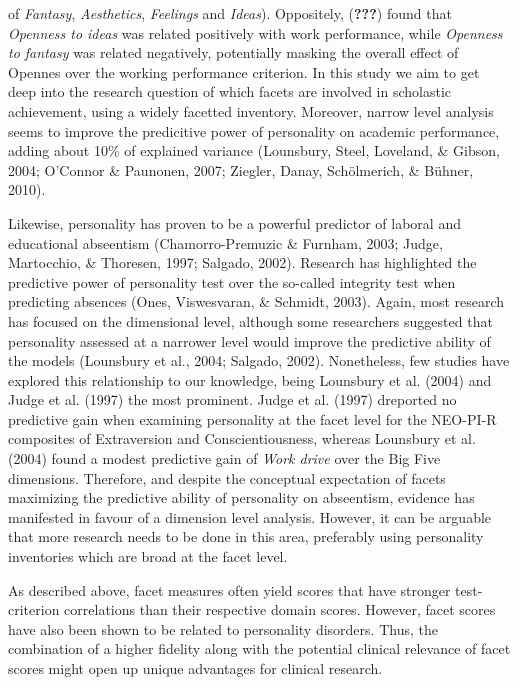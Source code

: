 \documentclass[,man,floatsintext]{apa6}
\begin{document}
of \emph{Fantasy}, \emph{Aesthetics}, \emph{Feelings} and \emph{Ideas}).
Oppositely, ({\textbf{???}}) found that \emph{Openness to ideas} was
related positively with work performance, while \emph{Openness to
fantasy} was related negatively, potentially masking the overall effect
of Opennes over the working performance criterion. In this study we aim
to get deep into the research question of which facets are involved in
scholastic achievement, using a widely facetted inventory. Moreover,
narrow level analysis seems to improve the predicitive power of
personality on academic performance, adding about 10\% of explained
variance (Lounsbury, Steel, Loveland, \& Gibson, 2004; O'Connor \&
Paunonen, 2007; Ziegler, Danay, Schölmerich, \& Bühner, 2010).

Likewise, personality has proven to be a powerful predictor of laboral
and educational abseentism (Chamorro-Premuzic \& Furnham, 2003; Judge,
Martocchio, \& Thoresen, 1997; Salgado, 2002). Research has highlighted
the predictive power of personality test over the so-called integrity
test when predicting absences (Ones, Viswesvaran, \& Schmidt, 2003).
Again, most research has focused on the dimensional level, although some
researchers suggested that personality assessed at a narrower level
would improve the predictive ability of the models (Lounsbury et al.,
2004; Salgado, 2002). Nonetheless, few studies have explored this
relationship to our knowledge, being Lounsbury et al. (2004) and Judge
et al. (1997) the most prominent. Judge et al. (1997) dreported no
predictive gain when examining personality at the facet level for the
NEO-PI-R composites of Extraversion and Conscientiousness, whereas
Lounsbury et al. (2004) found a modest predictive gain of \emph{Work
drive} over the Big Five dimensions. Therefore, and despite the
conceptual expectation of facets maximizing the predictive ability of
personality on abseentism, evidence has manifested in favour of a
dimension level analysis. However, it can be arguable that more research
needs to be done in this area, preferably using personality inventories
which are broad at the facet level.

As described above, facet measures often yield scores that have stronger
test-criterion correlations than their respective domain scores.
However, facet scores have also been shown to be related to personality
disorders. Thus, the combination of a higher fidelity along with the
potential clinical relevance of facet scores might open up unique
advantages for clinical research.
\end{document}
